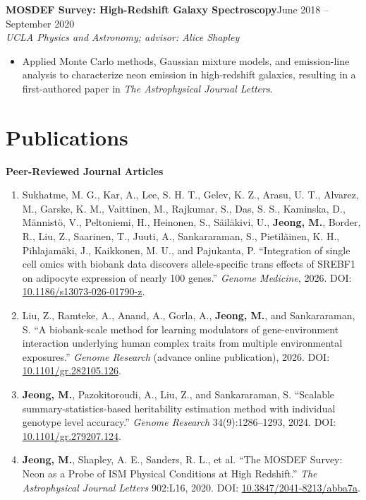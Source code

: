 \documentclass[10pt,letterpaper]{article}
\newcommand{\entry}[4]{\noindent\textbf{#1}\hfill #2\\ {\itshape #3}\hfill #4\par}
\begin{document}
\entry{MOSDEF Survey: High-Redshift Galaxy Spectroscopy}{June 2018 -- September 2020}{UCLA Physics and Astronomy; advisor: Alice Shapley}{}
\begin{itemize}
\item Applied Monte Carlo methods, Gaussian mixture models, and emission-line analysis to characterize neon emission in high-redshift galaxies, resulting in a first-authored paper in \emph{The Astrophysical Journal Letters}.
\end{itemize}

\section{Publications}
\textbf{Peer-Reviewed Journal Articles}
\begin{enumerate}
\item Sukhatme, M. G., Kar, A., Lee, S. H. T., Gelev, K. Z., Arasu, U. T., Alvarez, M., Garske, K. M., Vaittinen, M., Rajkumar, S., Das, S. S., Kaminska, D., M\"annist\"o, V., Peltoniemi, H., Heinonen, S., S\"ail\"akivi, U., \textbf{Jeong, M.}, Border, R., Liu, Z., Saarinen, T., Juuti, A., Sankararaman, S., Pietil\"ainen, K. H., Pihlajam\"aki, J., Kaikkonen, M. U., and Pajukanta, P. ``Integration of single cell omics with biobank data discovers allele-specific trans effects of SREBF1 on adipocyte expression of nearly 100 genes.'' \emph{Genome Medicine}, 2026. DOI: \href{https://doi.org/10.1186/s13073-026-01790-z}{10.1186/s13073-026-01790-z}.
\item Liu, Z., Ramteke, A., Anand, A., Gorla, A., \textbf{Jeong, M.}, and Sankararaman, S. ``A biobank-scale method for learning modulators of gene-environment interaction underlying human complex traits from multiple environmental exposures.'' \emph{Genome Research} (advance online publication), 2026. DOI: \href{https://doi.org/10.1101/gr.282105.126}{10.1101/gr.282105.126}.
\item \textbf{Jeong, M.}, Pazokitoroudi, A., Liu, Z., and Sankararaman, S. ``Scalable summary-statistics-based heritability estimation method with individual genotype level accuracy.'' \emph{Genome Research} 34(9):1286--1293, 2024. DOI: \href{https://doi.org/10.1101/gr.279207.124}{10.1101/gr.279207.124}.
\item \textbf{Jeong, M.}, Shapley, A. E., Sanders, R. L., et al. ``The MOSDEF Survey: Neon as a Probe of ISM Physical Conditions at High Redshift.'' \emph{The Astrophysical Journal Letters} 902:L16, 2020. DOI: \href{https://doi.org/10.3847/2041-8213/abba7a}{10.3847/2041-8213/abba7a}.
\end{enumerate}
\end{document}

